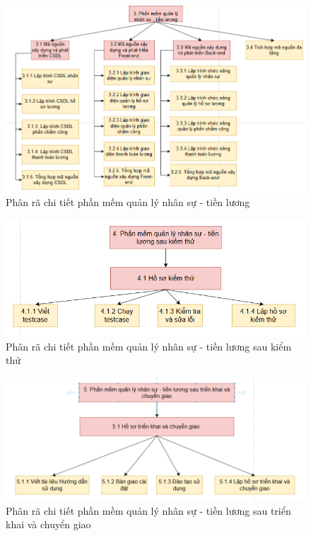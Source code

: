 \begin{figure}[H]
    \centering
    \includegraphics[width=\textwidth]{images/pmquanlyns-tl.png}
    \caption{Phân rã chi tiết phần mềm quản lý nhân sự - tiền lương}
\end{figure}
\begin{figure}[H]
    \centering
    \includegraphics[width=\textwidth]{images/pmsaukiemthu.png}
    \caption{Phân rã chi tiết phần mềm quản lý nhân sự - tiền lương sau kiểm thử}
\end{figure}
\begin{figure}[H]
    \centering
    \includegraphics[width=\textwidth]{images/pmsautrienkhai.png}
    \caption{Phân rã chi tiết phần mềm quản lý nhân sự - tiền lương sau triển khai và chuyển giao}
\end{figure}

